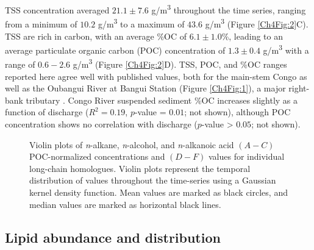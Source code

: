 TSS concentration averaged $21.1 \pm 7.6$ g/m\textsuperscript{3} throughout the time series, ranging from a minimum of $10.2$ g/m\textsuperscript{3} to a maximum of $43.6$ g/m\textsuperscript{3} (Figure \ref{Ch4Fig:2}C). TSS are rich in carbon, with an average \%OC of $6.1 \pm 1.0$\%, leading to an average particulate organic carbon (POC) concentration of $1.3 \pm 0.4$ g/m\textsuperscript{3} with a range of $0.6 - 2.6$ g/m\textsuperscript{3} (Figure \ref{Ch4Fig:2}D). TSS, POC, and \%OC ranges reported here agree well with published values, both for the main-stem Congo as well as the Oubangui River at Bangui Station (Figure \ref{Ch4Fig:1}), a major right-bank tributary \citep{Coynel:2005cn,Bouillon:2012cw,Bouillon:2014ko}. Congo River suspended sediment \%OC increases slightly as a function of discharge ($R^2 = 0.19$, $p$-value = $0.01$; not shown), although POC concentration shows no correlation with discharge ($p$-value > $0.05$; not shown). 

\begin{figure}[t]
	\caption[Concentration and  violin plots]{Violin plots of \textit{n}-alkane, \textit{n}-alcohol, and \textit{n}-alkanoic acid $(A - C)$ POC-normalized concentrations and $(D - F)$  values for individual long-chain homologues. Violin plots represent the temporal distribution of values throughout the time-series using a Gaussian kernel density function. Mean values are marked as black circles, and median values are marked as horizontal black lines.}
	\label{Ch4Fig:3} 
\end{figure}

\subsection{Lipid abundance and distribution}

